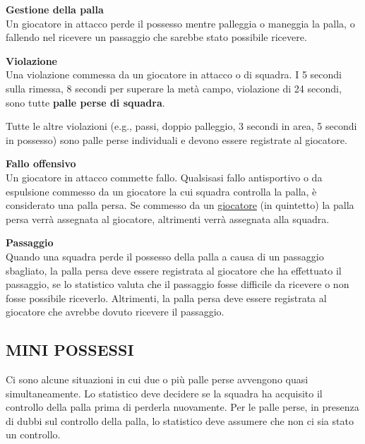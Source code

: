 \textbf{Gestione della palla}\\
Un giocatore in attacco perde il possesso mentre palleggia o maneggia la palla, o fallendo nel ricevere un passaggio che sarebbe stato possibile ricevere.

\textbf{Violazione}\\
Una violazione commessa da un giocatore in attacco o di squadra. I 5 secondi sulla rimessa, 8 secondi per superare la metà campo, violazione di 24 secondi, sono tutte \textbf{palle perse di squadra}. 

Tutte le altre violazioni (e.g., passi, doppio palleggio, 3 secondi in area, 5 secondi in possesso) sono palle perse individuali e devono essere registrate al giocatore.

\textbf{Fallo offensivo}\\
Un giocatore in attacco commette fallo. Qualsisasi fallo antisportivo o da espulsione commesso da un giocatore la cui squadra controlla la palla, è considerato una palla persa. Se commesso da un \underline{giocatore} (in quintetto) la palla persa verrà assegnata al giocatore, altrimenti verrà assegnata alla squadra.

\textbf{Passaggio}\\
Quando una squadra perde il possesso della palla a causa di un passaggio sbagliato, la palla persa deve essere registrata al giocatore che ha effettuato il passaggio, se lo statistico valuta che il passaggio fosse difficile da ricevere o non fosse possibile riceverlo. Altrimenti, la palla persa deve essere registrata al giocatore che avrebbe dovuto ricevere il passaggio.


\subsection{MINI POSSESSI}
\subsectionline

Ci sono alcune situazioni in cui due o più palle perse avvengono quasi simultaneamente. Lo statistico deve decidere se la squadra ha acquisito il controllo della palla prima di perderla nuovamente. Per le palle perse, in presenza di dubbi sul controllo della palla, lo statistico deve assumere che non ci sia stato un controllo.

